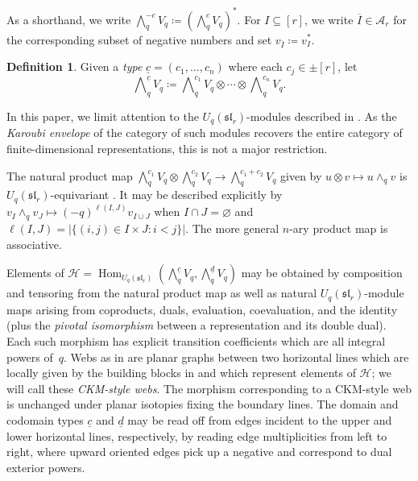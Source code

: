 \documentclass{amsart}
\theoremstyle{definition}
\newtheorem{definition}[theorem]{Definition}
\theoremstyle{remark}
\numberwithin{equation}{section}
\newcommand{\fsl}{\mathfrak{sl}}
\DeclareMathOperator{\Hom}{\mathrm{Hom}}
\begin{document}
As a shorthand, we write $\bigwedge\nolimits^{-c}_q V_q \coloneqq (\bigwedge\nolimits_q^c V_q)^*$.
 For $I \subseteq [r]$, we write $\overline{I} \in \mathcal{A}_r$ for the corresponding subset of negative numbers and set $v_{\overline{I}} \coloneqq v_I^*$. 

\begin{definition}\label{def:wedge_c}
Given a \emph{type} $\underline{c} = (c_1, \ldots, c_n)$ where each $c_j \in \pm [r]$, let
  \[ \bigwedge\nolimits_q^{\underline{c}} V_q \coloneqq \bigwedge\nolimits_q^{c_1} V_q \otimes \cdots \otimes \bigwedge\nolimits_q^{c_n} V_q. \]
\end{definition}

In this paper, we limit attention to the  $U_q(\fsl_r)$-modules described in . As the \emph{Karoubi envelope} of the category of such modules recovers the entire category of finite-dimensional representations, this is not a major restriction.

The natural product map $\bigwedge\nolimits_q^{c_1} V_q \otimes \bigwedge\nolimits_q^{c_2} V_q \to \bigwedge\nolimits_q^{c_1+c_2} V_q$ given by $u \otimes v \mapsto u \wedge_q v$ is $U_q(\fsl_r)$-equivariant \cite[\S3.1]{Cautis-Kamnitzer-Morrison}. It may be described explicitly by $v_I \wedge_q v_J \mapsto (-q)^{\ell(I, J)} v_{I \cup J}$ when $I \cap J = \varnothing$ and $\ell(I, J) = |\{(i, j) \in I \times J : i < j\}|$. The more general $n$-ary product map is associative.


Elements of $\mathcal{H}=\Hom_{U_q(\fsl_r)}\left(\bigwedge\nolimits_q^{\underline{c}} V_q, \bigwedge\nolimits_q^{\underline{d}} V_q\right)$ may be obtained by composition and tensoring from the natural product map as well as natural $U_q(\fsl_r)$-module maps arising from coproducts, duals, evaluation, coevaluation, and the identity (plus the \emph{pivotal isomorphism} between a representation and its double dual). Each such morphism has explicit transition coefficients\label{pg:transition_coeff} which are all integral powers of~$q$. Webs as in \cite{Morrison,Cautis-Kamnitzer-Morrison} are planar graphs between two horizontal lines which are locally given by the building blocks in  and which represent elements of $\mathcal{H}$; we will call these \emph{CKM-style webs}. The  morphism corresponding to a CKM-style web is unchanged under planar isotopies fixing the boundary lines. The domain and codomain types $\underline{c}$ and $\underline{d}$ may be read off from edges incident to the upper and lower horizontal lines, respectively, by reading edge multiplicities from left to right, where upward oriented edges pick up a negative and correspond to dual exterior powers.
\end{document}
